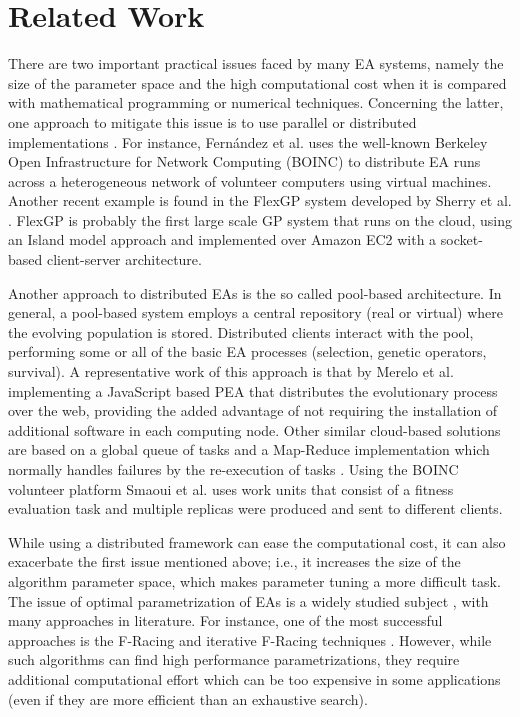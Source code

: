 \section{Related Work}
\label{sec:work}
There are two important practical issues faced by many EA systems, namely the size of the parameter 
space and the high computational cost when it is compared with mathematical programming or numerical techniques.
Concerning the latter, one approach to mitigate this issue is to use parallel or 
distributed implementations \cite{cantu-paz:migration-policies,duda2013gpu}.
For instance, Fern\'andez et al. \cite{nc} %
uses the well-known Berkeley Open Infrastructure for Network Computing (BOINC) to distribute EA runs across a
heterogeneous network of volunteer computers using virtual machines. Another recent example is 
found in the FlexGP system developed by Sherry et al. \cite{sherry2012flex}. FlexGP is probably the first large scale GP system 
that runs on the cloud, using an Island model approach and implemented over Amazon EC2 with a 
socket-based client-server architecture.

Another approach to distributed EAs is the so called pool-based architecture. In general, a 
pool-based system employs a central repository (real or virtual) where the evolving population is stored.
Distributed clients interact with the pool, performing some or all of the basic EA processes 
(selection, genetic operators, survival). A representative work of this approach 
is that by Merelo et al. \cite{agajaj} implementing a JavaScript based PEA that distributes 
the evolutionary process over the web, providing the added advantage of not requiring the 
installation of additional software in each computing node.  Other similar cloud-based solutions 
are based on a global queue of tasks and a Map-Reduce implementation which normally handles failures 
by the re-execution of  tasks \cite{fazenda2012,di2013towards,FlexGP}. Using the BOINC 
volunteer platform  Smaoui et al. \cite{FekiNG09} uses work units that consist of a fitness 
evaluation task and multiple replicas  were produced and sent to different clients.

While using a distributed framework can ease the computational cost, it can also exacerbate the first issue mentioned above;
i.e., it increases the size of the algorithm parameter space, which makes parameter tuning a more difficult task.
The issue of optimal parametrization of EAs is a widely studied subject \cite{de2007parameter}, 
with many approaches in literature. For instance, one of the most successful approaches 
is the F-Racing and iterative F-Racing techniques \cite{lopez2011irace}. 
However, while such algorithms can find high performance parametrizations, 
they require additional computational effort which can be too expensive in some applications
(even if they are more efficient than an exhaustive search).

